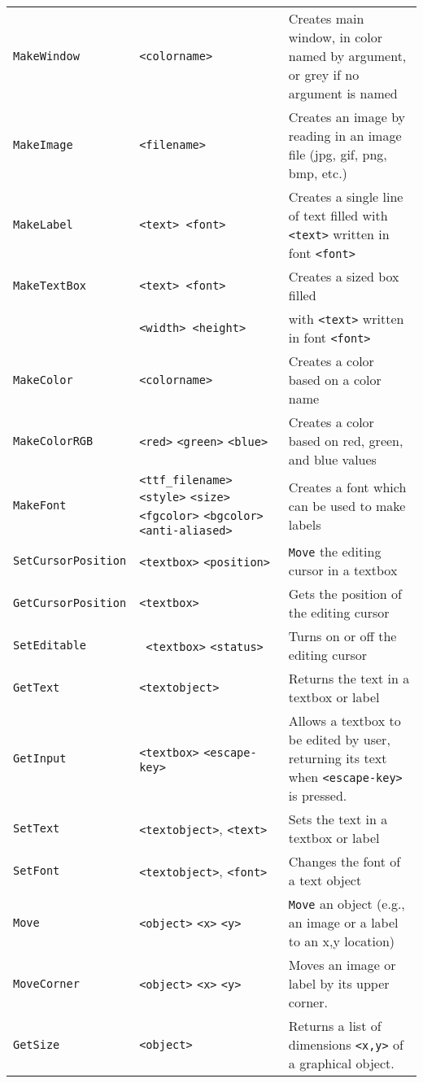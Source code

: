 \begin{longtable}{p{3cm}p{3cm}p{6cm}}
\verb+MakeWindow+ &\verb+<colorname>+ &Creates main window, in color named by argument, or grey if no argument is named\\ 
\verb+MakeImage+ &\verb+<filename>+ &Creates an image by reading in an image file (jpg, gif, png, bmp, etc.)\\ 
\verb+MakeLabel+ &\verb+<text> <font>+&Creates a single line of text filled with \verb+<text>+ written in font \verb+<font>+\\ 
\verb+MakeTextBox+ &\verb+<text> <font>+ &Creates a sized box filled \\ 
&\verb+<width> <height>+& with \verb+<text>+ written in font \verb+<font>+ \\ 
\verb+MakeColor+ &\verb+<colorname>+ & Creates a color based on a color name\\ 
\verb+MakeColorRGB+ &\verb+<red>+ \verb+<green>+ \verb+<blue>+ & Creates a color based on red, green, and blue values\\ 
\verb+MakeFont+ &\verb+<ttf_filename>+ \verb+<style>+ \verb+<size>+ \verb+<fgcolor>+ \verb+<bgcolor>+ \verb+<anti-aliased>+&Creates a font which can be used to make labels \\ 
\verb+SetCursorPosition+ &\verb+<textbox>+ \verb+<position>+ & \verb+Move+ the editing cursor in a textbox\\ 
\verb+GetCursorPosition+ &\verb+<textbox>+ &Gets the position of the editing cursor\\ 
\verb+SetEditable+ &\verb+ <textbox>+ \verb+<status>+& Turns on or off the editing cursor\\ 
\verb+GetText+ &\verb+<textobject>+ &Returns the text in a textbox or label\\ 
\verb+GetInput+ &\verb+<textbox>+ \verb+<escape-key>+& Allows a textbox to be edited by user, returning its text when \verb+<escape-key>+ is pressed.\\ 
\verb+SetText+ &\verb+<textobject>+, \verb+<text>+ &Sets the text in a textbox or label\\ 
\verb+SetFont+ &\verb+<textobject>+, \verb+<font>+ &Changes the font of a text object \\ 
\verb+Move+ &\verb+<object>+ \verb+<x>+ \verb+<y>+& \verb+Move+ an object (e.g., an image or a label to an x,y location) \\ 
\verb+MoveCorner+ &\verb+<object>+ \verb+<x>+ \verb+<y>+& Moves an image or label by its upper corner.\\ 
\verb+GetSize+ &\verb+<object>+ &Returns a list of dimensions \verb+<x,y>+ of a graphical object.\\ 

\end{longtable}
